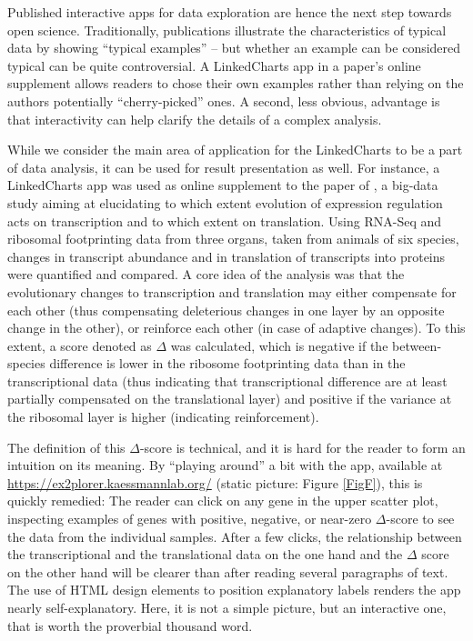 \documentclass[twocolumn,10pt]{article}
\begin{document}
Published interactive apps for data exploration are hence the next step towards open science. Traditionally, publications illustrate the characteristics of typical data by showing ``typical examples'' -- but whether an example can be considered typical can be quite controversial. A LinkedCharts app in a paper's online supplement allows readers to chose their own examples rather than relying on the authors potentially ``cherry-picked'' ones. A second, less obvious, advantage is that interactivity can help clarify the details of a complex analysis.

While we consider the main area of application for the LinkedCharts to be a part of data analysis, it can be used for result presentation as well. For instance, a LinkedCharts app was used as online supplement to the paper of \citet{wang_2020}, a big-data study aiming at elucidating to which extent evolution of expression regulation acts on transcription and to which extent on translation. Using RNA-Seq and ribosomal footprinting data from three organs, taken from animals of six species, changes in transcript abundance and in translation of transcripts into proteins were quantified and compared. A core idea of the analysis was that the evolutionary changes to transcription and translation may either compensate for each other  (thus compensating deleterious changes in one layer by an opposite change in the other), or reinforce each other (in case of adaptive changes). To this extent, a score denoted as $\Delta$ was calculated, which is negative if the between-species difference is lower in the ribosome footprinting data than in the transcriptional data (thus indicating that transcriptional difference are at least partially compensated on the translational layer) and positive if the variance at the ribosomal layer is higher (indicating reinforcement).

The definition of this $\Delta$-score is technical, and it is hard for the reader to form an intuition on its meaning. By ``playing around'' a bit with the app, available at \url{https://ex2plorer.kaessmannlab.org/} (static picture: Figure \ref{FigF}), this is quickly remedied:  The reader can click on any gene in the upper scatter plot, inspecting examples of genes with positive, negative, or near-zero $\Delta$-score to see the data from the individual samples. After a few clicks, the relationship between the transcriptional and the translational data on the one hand and the $\Delta$ score on the other hand will be clearer than after reading several paragraphs of text. The use of HTML design elements to position explanatory labels renders the app nearly self-explanatory. Here, it is not a simple picture, but an interactive one, that is worth the proverbial thousand word. 
\end{document}
